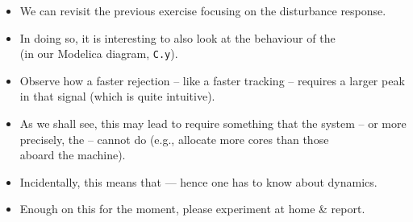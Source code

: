 \begin{frame}
\myPause
 \begin{itemize}[<+-| alert@+>]
 \item We can revisit the previous exercise focusing on the disturbance response.
 \item In doing so, it is interesting to also look at the behaviour of the \\
       (in our Modelica diagram, \texttt{C.y}).
 \item Observe how a faster rejection -- like a faster tracking -- requires a larger peak\\
       in that signal (which is quite intuitive).
 \item As we shall see, this may lead to require something that the system -- or more\\
       precisely, the  -- cannot do (e.g., allocate more cores than those\\
       aboard the machine).
 \item Incidentally, this means that  --- hence one has to know about dynamics.
 \item \vfill Enough on this for the moment, please experiment at home \& report.
 \end{itemize}
\end{frame}
